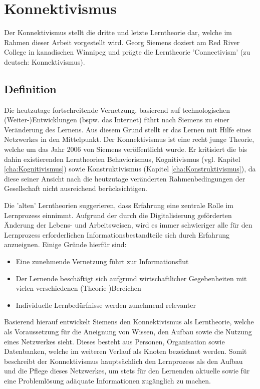 \chapter{Konnektivismus}
\label{cha:Konnektivismus}
Der Konnektivismus stellt die dritte und letzte Lerntheorie dar, welche im Rahmen dieser Arbeit vorgestellt wird. Georg Siemens doziert am Red River College in kanadischen Winnipeg und prägte die Lerntheorie 'Connectivism' (zu deutsch: Konnektivismus).\cite[S. 159]{Erpenbeck.2007}

\section{Definition}\label{Konnektivismus Definition}
Die heutzutage fortschreitende Vernetzung, basierend auf technologischen (Weiter-)Entwicklungen (bspw. das Internet) führt nach Siemens zu einer Veränderung des Lernens. Aus diesem Grund stellt er das Lernen mit Hilfe eines Netzwerkes in den Mittelpunkt. Der Konnektivismus ist eine recht junge Theorie, welche um das Jahr 2006 von Siemens veröffentlicht wurde. Er kritisiert die bis dahin existierenden Lerntheorien Behaviorismus, Kognitivismus (vgl. Kapitel \ref{cha:Kognitivismus}) sowie Konstruktivismus (Kapitel \ref{cha:Konstruktivismus}), da diese seiner Ansicht nach die heutzutage veränderten Rahmenbedingungen der Gesellschaft nicht ausreichend berücksichtigen.\cite[S.47 f.]{Kuhlmann.2008} 

Die 'alten' Lerntheorien suggerieren, dass Erfahrung eine zentrale Rolle im Lernprozess einnimmt. Aufgrund der durch die Digitalisierung geförderten Änderung der Lebens- und Arbeitsweisen, wird es immer schwieriger alle für den Lernprozess erforderlichen Informationsbestandteile sich durch Erfahrung anzueignen.\cite[S. 159ff.]{Erpenbeck.2007} Einige Gründe hierfür sind:
\begin{itemize}
	\item Eine zunehmende Vernetzung führt zur Informationsflut
	\item Der Lernende beschäftigt sich aufgrund wirtschaftlicher Gegebenheiten mit vielen verschiedenen (Theorie-)Bereichen
	\item Individuelle Lernbedürfnisse werden zunehmend relevanter
\end{itemize}
Basierend hierauf entwickelt Siemens den Konnektivismus als Lerntheorie, welche als Voraussetzung für die Aneignung von Wissen, den Aufbau sowie die Nutzung eines Netzwerkes sieht. Dieses besteht aus Personen, Organisation sowie Datenbanken, welche im weiteren Verlauf als Knoten bezeichnet werden. Somit beschreibt der Konnektivismus hauptsächlich den Lernprozess als den Aufbau und die Pflege dieses Netzwerkes, um stets für den Lernenden aktuelle sowie für eine Problemlösung adäquate Informationen zugänglich zu machen.

